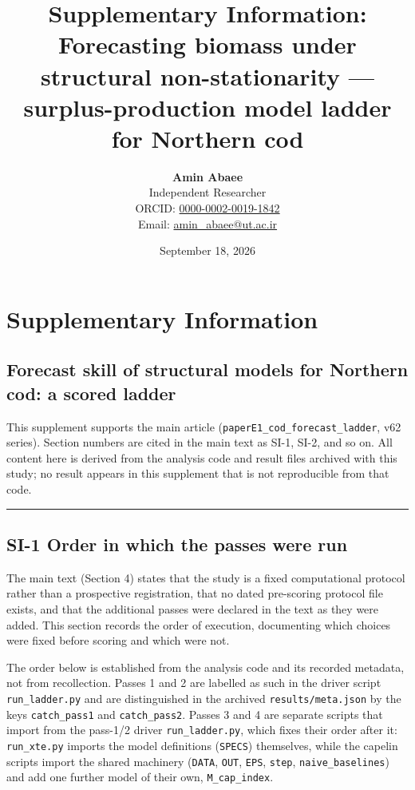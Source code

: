 \documentclass[11pt]{article}
\title{Supplementary Information: Forecasting biomass under structural non-stationarity — surplus-production model ladder for Northern cod}
\author{\textbf{Amin Abaee}\\ Independent Researcher\\[2pt] ORCID: \href{https://orcid.org/0000-0002-0019-1842}{0000-0002-0019-1842}\\ Email: \href{mailto:amin_abaee@ut.ac.ir}{amin_abaee@ut.ac.ir}}
\date{September 18, 2026}
\begin{document}
\maketitle

\section{Supplementary Information}\label{supplementary-information}

\subsection{Forecast skill of structural models for Northern cod: a
scored
ladder}\label{forecast-skill-of-structural-models-for-northern-cod-a-scored-ladder}

This supplement supports the main article
(\texttt{paperE1\_cod\_forecast\_ladder}, v62 series). Section numbers
are cited in the main text as SI-1, SI-2, and so on. All content here is
derived from the analysis code and result files archived with this
study; no result appears in this supplement that is not reproducible
from that code.

\begin{center}\rule{0.5\linewidth}{0.5pt}\end{center}

\subsection{SI-1 Order in which the passes were
run}\label{si-1-order-in-which-the-passes-were-run}

The main text (Section 4) states that the study is a fixed computational
protocol rather than a prospective registration, that no dated
pre-scoring protocol file exists, and that the additional passes were
declared in the text as they were added. This section records the order
of execution, documenting which choices were fixed before scoring and
which were not.

The order below is established from the analysis code and its recorded
metadata, not from recollection. Passes 1 and 2 are labelled as such in
the driver script \texttt{run\_ladder.py} and are distinguished in the
archived \texttt{results/meta.json} by the keys \texttt{catch\_pass1}
and \texttt{catch\_pass2}. Passes 3 and 4 are separate scripts that
import from the pass-1/2 driver \texttt{run\_ladder.py}, which fixes
their order after it: \texttt{run\_xte.py} imports the model definitions
(\texttt{SPECS}) themselves, while the capelin scripts import the shared
machinery (\texttt{DATA}, \texttt{OUT}, \texttt{EPS}, \texttt{step},
\texttt{naive\_baselines}) and add one further model of their own,
\texttt{M\_cap\_index}.
\end{document}
